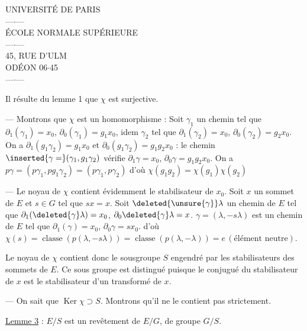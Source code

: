 
\begin{center}
UNIVERSITÉ DE PARIS\\
---$\cdot$---\\
ÉCOLE NORMALE SUPÉRIEURE\\
---$\cdot$---\\
45, RUE D'ULM\\
ODÉON 06$\cdot$45\\
---$\cdot$---
\end{center}

Il résulte du lemme 1 que $\chi$ est surjective.

--- Montrons que $\chi$ est  un homomorphisme :  Soit $\gamma_1$ un  chemin tel que $\partial_1(\gamma_1)=x_0$, $\partial_0(\gamma_1)=g_1x_0$, idem  $\gamma_2$ tel que $\partial_1(\gamma_2)=x_0$, $\partial_0(\gamma_2)=g_2x_0$. On a $\partial_1(g_1\gamma_2)=g_1x_0$ et $\partial_0(g_1\gamma_2)=g_1g_2x_0$ : le chemin $\inserted{\gamma=}(\gamma_1,g_1\gamma_2)$ vérifie $\partial_1\gamma=x_0$, $\partial_0\gamma=g_1g_2x_0$.  On a $p\gamma=(p\gamma_1,pg_1\gamma_2)=(p\gamma_1,p\gamma_2)$  d'où $\chi(g_1g_2)=\chi(g_1)\chi(g_2)$

--- Le noyau de $\chi$ contient évidemment le stabilisateur de $x_0$. Soit $x$ un sommet de $E$ et $s\in G$ tel que $sx=x$. Soit $\deleted{\unsure{\gamma}}\lambda$ un chemin de $E$ tel que $\partial_1(\deleted{\gamma}\lambda)=x_0$, $\partial_0\deleted{\gamma}\lambda=x$.  $\gamma=(\lambda,-s\lambda)$ est un chemin de $E$ tel que $\partial_1(\gamma)=x_0$, $\partial_0\gamma=sx_0$. d'où $\chi(s)=\operatorname{classe}(p(\lambda,-s\lambda))=\operatorname{classe}(p(\lambda,-\lambda))=e\,(\text{élément neutre})$.

Le noyau de $\chi$ contient donc le sousgroupe $S$  engendré par les stabilisateurs des  sommets de $E$. Ce sous groupe est distingué puisque le conjugué du stabilisateur de $x$ est le stabilisateur d'un transformé de $x$.

--- On sait que $\operatorname{Ker}\chi\supset S$. Montrons qu'il ne le contient pas strictement.

\uline{Lemme 3} : $E/S$ est un revêtement  de $E/G$, de groupe $G/S$.


